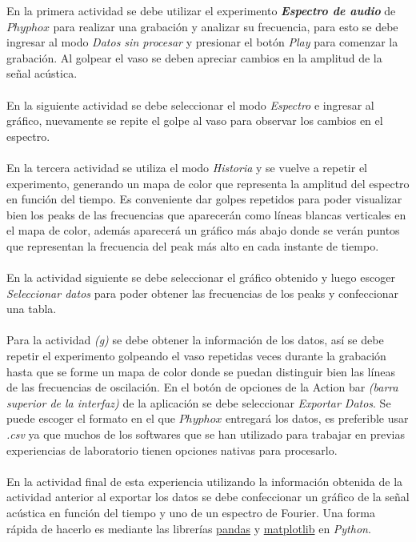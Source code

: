 \documentclass[letterpaper,11pt]{article} %
\begin{document}
En la primera actividad se debe utilizar el experimento \textbf{\textit{Espectro de audio}} de $Phyphox$ para realizar una grabación y analizar su frecuencia, para esto se debe ingresar al modo \textit{Datos sin procesar} y presionar el botón \textit{Play} para comenzar la grabación. Al golpear el vaso se deben apreciar cambios en la amplitud de la señal acústica. \\ \\
En la siguiente actividad se debe seleccionar el modo \textit{Espectro} e ingresar al gráfico, nuevamente se repite el golpe al vaso para observar los cambios en el espectro. \\ \\
En la tercera actividad se utiliza el modo \textit{Historia} y se vuelve a repetir el experimento, generando un mapa de color que representa la amplitud del espectro en función del tiempo. Es conveniente dar golpes repetidos para poder visualizar bien los peaks de las frecuencias que aparecerán como líneas blancas verticales en el mapa de color, además aparecerá un gráfico más abajo donde se verán puntos que representan la frecuencia del peak más alto en cada instante de tiempo.  \\ \\
En la actividad siguiente se debe seleccionar el gráfico obtenido y luego escoger \textit{Seleccionar datos} para poder obtener las frecuencias de los peaks y confeccionar una tabla. \\ \\
Para la actividad \textit{(g)} se debe obtener la información de los datos, así se debe repetir el experimento golpeando el vaso repetidas veces durante la grabación hasta que se forme un mapa de color donde se puedan distinguir bien las líneas de las frecuencias de oscilación. En el botón de opciones de la Action bar \textit{(barra superior de la interfaz)} de la aplicación se debe seleccionar \textit{Exportar Datos}. Se puede escoger el formato en el que $Phyphox$ entregará los datos, es preferible usar \textit{.csv} ya que muchos de los softwares que se han utilizado para trabajar en previas experiencias de laboratorio tienen opciones nativas para procesarlo. \\ \\
En la actividad final de esta experiencia utilizando la información obtenida de la actividad anterior al exportar los datos se debe confeccionar un gráfico de la señal acústica en función del tiempo y uno de un espectro de Fourier. Una forma rápida de hacerlo es mediante las librerías \href{https://pandas.pydata.org/}{pandas} y \href{https://matplotlib.org/}{matplotlib} en \textit{Python}. \\ \\
\end{document}
